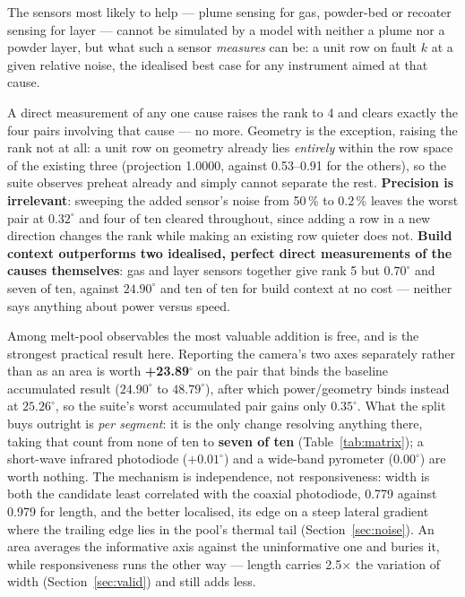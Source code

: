 \documentclass[preprint,times]{elsarticle}
\begin{document}
The sensors most likely to help --- plume sensing for gas, powder-bed or
recoater sensing for layer \cite{Liu2022,Bugatti2022} --- cannot be simulated by
a model with neither a plume nor a powder layer, but what such a sensor
\emph{measures} can be: a unit row on fault $k$ at a given relative noise, the
idealised best case for any instrument aimed at that cause.

A direct measurement of any one cause raises the rank to 4 and clears exactly the
four pairs involving that cause --- no more. Geometry is the exception, raising
the rank not at all: a unit row on geometry already lies \emph{entirely} within
the row space of the existing three (projection 1.0000, against 0.53--0.91 for
the others), so the suite observes preheat already and simply cannot separate the
rest. \textbf{Precision is irrelevant}: sweeping the added sensor's noise from
50\,\% to 0.2\,\% leaves the worst pair at $0.32^\circ$ and four of ten cleared
throughout, since adding a row in a new direction changes the rank while making
an existing row quieter does not. \textbf{Build context outperforms two
idealised, perfect direct measurements of the causes themselves}: gas and layer
sensors together give rank 5 but $0.70^\circ$ and seven of ten, against
$24.90^\circ$ and ten of ten for build context at no cost --- neither says
anything about power versus speed.

Among melt-pool observables the most valuable addition is free, and is the
strongest practical result here. Reporting the camera's two axes separately
rather than as an area is worth \textbf{+23.89$^\circ$} on the pair that binds
the baseline accumulated result ($24.90^\circ$ to $48.79^\circ$), after which
power/geometry binds instead at $25.26^\circ$, so the suite's worst accumulated
pair gains only $0.35^\circ$. What the split buys outright is \emph{per
segment}: it is the only change resolving anything there, taking that count
from none of ten to \textbf{seven of ten} (Table~\ref{tab:matrix}); a short-wave infrared photodiode
($+0.01^\circ$) and a wide-band pyrometer ($0.00^\circ$) are worth nothing. The
mechanism is independence, not responsiveness: width is both the candidate least
correlated with the coaxial photodiode, 0.779 against 0.979 for length, and the
better localised, its edge on a steep lateral gradient where the trailing edge
lies in the pool's thermal tail (Section~\ref{sec:noise}). An area averages the
informative axis against the uninformative one and buries it, while
responsiveness runs the other way --- length carries 2.5$\times$ the variation of
width (Section~\ref{sec:valid}) and still adds less.
\end{document}
